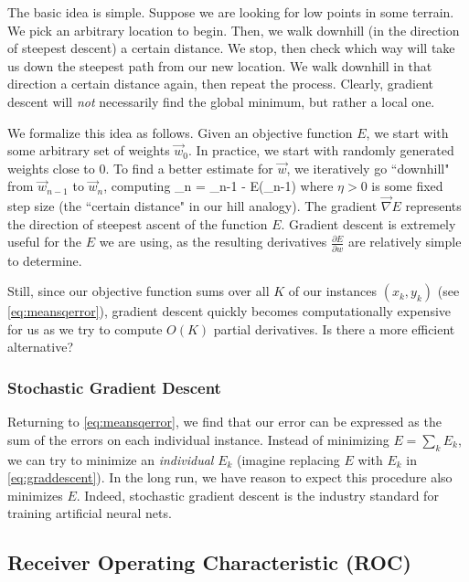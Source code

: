 \documentclass[10pt]{article}
\begin{document}
The basic idea is simple.
Suppose we are looking for low points in some terrain.
We pick an arbitrary location to begin.
Then, we walk downhill (in the direction of steepest descent) a certain distance.
We stop, then check which way will take us down the steepest path from our new location.
We walk downhill in that direction a certain distance again, then repeat the process.
Clearly, gradient descent will \emph{not} necessarily find the global minimum, but rather a local one.

We formalize this idea as follows.
Given an objective function $E$, we start with some arbitrary set of weights $\vec{w}_0$.
In practice, we start with randomly generated weights close to 0.
To find a better estimate for $\vec{w}$, we iteratively go ``downhill" from $\vec{w}_{n-1}$ to $\vec{w}_{n}$, computing
\beq
\label{eq:graddescent}
_n = _{n-1} - \eta\vec{\nabla} E(_{n-1})
\eeq
where $\eta > 0$ is some fixed step size (the ``certain distance" in our hill analogy).
The gradient $\vec{\nabla} E$ represents the direction of steepest ascent of the function $E$.
Gradient descent is extremely useful for the $E$ we are using, as the resulting derivatives $\frac{\partial E}{\partial w}$ are relatively simple to determine.

Still, since our objective function sums over all $K$ of our instances $(x_k, y_k)$ (see \cref{eq:meansqerror}), gradient descent quickly becomes computationally expensive for us as we try to compute $O(K)$ partial derivatives.
Is there a more efficient alternative?

\subsubsection{Stochastic Gradient Descent}

Returning to \cref{eq:meansqerror}, we find that our error can be expressed as the sum of the errors on each individual instance.
Instead of minimizing $E = \sum_k E_k$, we can try to minimize an \emph{individual} $E_k$ (imagine replacing $E$ with $E_k$ in \cref{eq:graddescent}).
In the long run, we have reason to expect this procedure also minimizes $E$.
Indeed, stochastic gradient descent is the industry standard for training artificial neural nets.

\subsection{Receiver Operating Characteristic (ROC)}
\label{subsec:roc}
\end{document}
